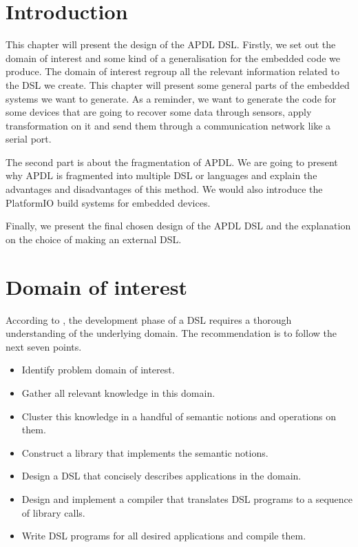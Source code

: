 \label{chap:dsl_design}

\section{Introduction}
\label{sec:design_intro}

This chapter will present the design of the \gls{APDL} \gls{DSL}. Firstly, we
set out the domain of interest and some kind of a generalisation for the embedded
code we produce. The domain of interest regroup all the relevant information
related to the \gls{DSL} we create. This chapter will present some general parts
of the embedded systems we want to generate. As a reminder, we want to generate
the code for some devices that are going to recover some data through
sensors, apply transformation on it and send them through a communication network
like a serial port.

The second part is about the fragmentation of \gls{APDL}. We are going to
present why \gls{APDL} is fragmented into multiple \gls{DSL} or languages and explain
the advantages and disadvantages of this method. We would also introduce the
PlatformIO build systems for embedded devices.

Finally, we present the final chosen design of the \gls{APDL} \gls{DSL} and the
explanation on the choice of making an external \gls{DSL}.

\section{Domain of interest}
\label{sec:design_domain_of_interest}

According to \cite{little_languages_little_maintenance}, the development phase
of a \gls{DSL} requires a thorough understanding of the underlying domain. The
recommendation is to follow the next seven points\cite{little_languages_little_maintenance}.

\begin{itemize}
\item Identify problem domain of interest.
\item Gather all relevant knowledge in this domain.
\item Cluster this knowledge in a handful of semantic notions and operations on them.
\item Construct a library that implements the semantic notions.
\item Design a DSL that concisely describes applications in the domain.
\item Design and implement a compiler that translates DSL programs to a sequence of library calls.
\item Write DSL programs for all desired applications and compile them.
\end{itemize}

